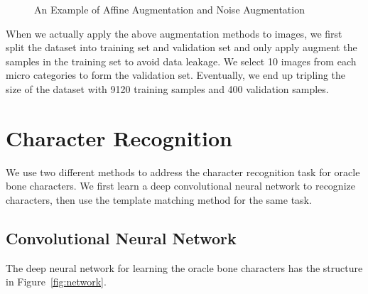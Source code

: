 \documentclass[journal]{IEEEtran}
\begin{document}
\begin{figure}[h]
\begin{minipage}{0.2\linewidth}
{		}
	\end{minipage}
	\begin{minipage}{0.2\linewidth}
	\end{minipage}
	\caption{An Example of Affine Augmentation and Noise Augmentation}
	\label{fig:aug-example}
\end{figure}

When we actually apply the above augmentation methods to images, we first split the dataset into training set and validation set and only apply augment the samples in the training set to avoid data leakage.
We select 10 images from each micro categories to form the validation set.
Eventually, we end up tripling the size of the dataset with 9120 training samples and 400 validation samples.

\section{Character Recognition}
We use two different methods to address the character recognition task for oracle bone characters.
We first learn a deep convolutional neural network to recognize characters, then use the template matching method for the same task.

\subsection{Convolutional Neural Network}
The deep neural network for learning the oracle bone characters has the structure in Figure~\ref{fig:network}.
\end{document}
